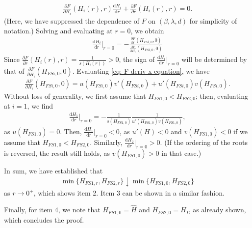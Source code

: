 \documentclass{article}
\theoremstyle{definition}
\numberwithin{equation}{section}
\newcommand{\dd}{\mathrm{d}}
\begin{document}
\begin{align*}
    \frac{\partial F}{\partial H_i}(H_i(r),r)\frac{\dd H_i}{\dd r}+\frac{\partial F}{\partial r} (H_i(r),r)=0.
\end{align*}
(Here, we have suppressed the dependence of $F$ on $(\beta,\lambda,d)$ for simplicity of notation.)
Solving and evaluating at $r=0$, we obtain
\begin{align*}
    \frac{\dd H_i}{\dd r}\Big\rvert_{r=0} = -\frac{\frac{\partial F}{\partial r}(H_{FSi,0},0)}{\frac{\partial F}{\partial H_i} (H_{FSi,0},0)}
\end{align*}
Since $\frac{\partial F}{\partial r}(H_i(r),r) = \frac{1}{s(H_i(r))}>0$, the sign of $\frac{\dd H_i}{\dd r}\big\rvert_{r=0}$ will be determined by that of $\frac{\partial F}{\partial H_i} (H_{FSi,0},0)$. Evaluating \eqref{eq: F deriv x equation}, we have
\begin{align*}
    \frac{\partial F}{\partial H_i}(H_{FSi,0},0) = u(H_{FSi,0})v'(H_{FSi,0})+u'(H_{FSi,0})v(H_{FSi,0}).
\end{align*}
Without loss of generality, we first assume that $H_{FS1,0}<H_{FS2,0}$; then, evaluating at $i=1$, we find
\begin{align*}
    \frac{\dd H_1}{\dd r}\Big\rvert_{r=0} = -\frac{1}{s(H_{FS1,0})}\frac{1}{u'(H_{FS1,0})v(H_{FS1,0})},
\end{align*}
as $u(H_{FS1,0})=0$.
Then, $\frac{\dd H_1}{\dd r}\big\rvert_{r=0} <0$, as $u'(H)<0$ and $v(H_{FS1,0})<0$ if we assume that $H_{FS1,0}<H_{FS2,0}$. Similarly, $\frac{\dd H_2}{\dd r}\big\rvert_{r=0}>0$. (If the ordering of the roots is reversed, the result still holds, as $v(H_{FS1,0})>0$ in that case.)  

In sum, we have established that
\begin{align*}
    \min\{H_{FS1,r},H_{FS2,r}\} \downarrow\min\{H_{FS1,0},H_{FS2,0}\}
\end{align*}
as $r\to 0^+$, which shows item 2. Item 3 can be shown in a similar fashion.

Finally, for item 4, we note that $H_{FS1,0}=\hat{H}$ and $H_{FS2,0}=H_I$, as already shown, which concludes the proof.

\end{document}

